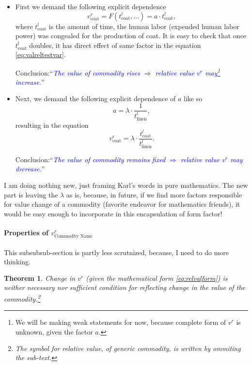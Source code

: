\documentclass[12pt]{extarticle}
\newtheorem{theorem}{Theorem}[section]
\theoremstyle{definition}
\begin{document}
\begin{itemize}
\item First we demand the following explicit dependence
  \begin{equation}
  v_{\text{coat}}^{r} = F(t_{\text{coat}}^l, \ldots) = a\cdot t_{\text{coat}}^l, 
\end{equation}
where $t_{\text{coat}}^l$ is the amount of time, the human labor (expended human labor power) was congealed for the production of coat.
It is easy to check that once $t_{\text{coat}}^l$ doubles, it has direct effect of same factor in the equation \ref{eq:valreltestvar}.

Conclusion:``\emph{\textcolor{blue}{The value of commodity rises $\Rightarrow$ relative value $v^r$ may\footnote{We will be making weak statements for now, because complete form of $v^r$ is unknown, given the factor $a$.} increase.}}''

\item Next, we demand the following explicit dependence of $a$ like so
  \begin{equation}
    \label{eq:adep}
    a = \lambda\cdot\frac{1}{t_{\text{linen}}^l},
  \end{equation}
  resulting in the equation
  \begin{equation}
    \label{eq:relvalform}
     v_{\text{coat}}^{r} = \lambda \cdot \frac{t_{\text{coat}}^l}{t_{\text{linen}}^l}.
   \end{equation}
   
   Conclusion:``\emph{\textcolor{blue}{The value of commodity remains fixed $\Rightarrow$ relative value $v^r$ may decrease.}}''
 \end{itemize}
 I am doing nothing new, just framing Karl's words in pure mathematics.  The new part is leaving the $\lambda$ as is, because, in future, if we find more factors responsible for value change of a commodity (favorite endeavor for mathematics friends), it would be easy enough to incorporate in this encapsulation of form factor!

 \paragraph{Properties of $v_{\text{Commodity Name}}^{r}$}
 This subsubsub-section is partly less scrutnized, because, I need to do more thinking.

 \begin{theorem}
 Change in $v^{r}$ (given the mathematical form \ref{eq:relvalform}) is neither necessary nor sufficient condition for reflecting change in the value of the commodity.\footnote{The symbol for relative value, of generic commodity, is written by ommiting the sub-text.}
 \end{theorem}
\end{document}

